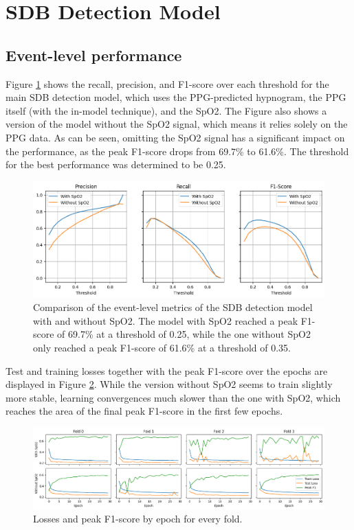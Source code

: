 \section{SDB Detection Model}

\subsection*{Event-level performance}

Figure \ref{fig:event-metrics} shows the recall, precision, and F1-score over each threshold for the main SDB detection model, which uses the PPG-predicted hypnogram, the PPG itself (with the in-model technique), and the SpO2. The Figure also shows a version of the model without the SpO2 signal, which means it relies solely on the PPG data. As can be seen, omitting the SpO2 signal has a significant impact on the performance, as the peak F1-score drops from 69.7\% to 61.6\%. The threshold for the best performance was determined to be 0.25.

\begin{figure}
    \centering
    \includegraphics[width=\textwidth]{images/DetectionModelEventMetrics}
    \caption{Comparison of the event-level metrics of the SDB detection model with and without SpO2. The model with SpO2 reached a peak F1-score of 69.7\% at a threshold of 0.25, while the one without SpO2 only reached a peak F1-score of 61.6\% at a threshold of 0.35.}
    \label{fig:event-metrics}
\end{figure}

Test and training losses together with the peak F1-score over the epochs are displayed in Figure \ref{fig:event-epoch-losses}. While the version without SpO2 seems to train slightly more stable, learning convergences much slower than the one with SpO2, which reaches the area of the final peak F1-score in the first few epochs.

\begin{figure}
    \centering
    \includegraphics[width=\textwidth]{images/DetectionModelEpochLosses}
    \caption{Losses and peak F1-score by epoch for every fold.}
    \label{fig:event-epoch-losses}
\end{figure}

